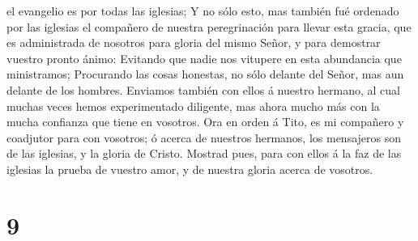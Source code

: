 el evangelio es por todas las iglesias;  Y no sólo esto,
mas también fué ordenado por las iglesias el compañero de nuestra
peregrinación para llevar esta gracia, que es administrada de nosotros
para gloria del mismo Señor, y para demostrar vuestro pronto ánimo:
 Evitando que nadie nos vitupere en esta abundancia que
ministramos;  Procurando las cosas honestas, no sólo
delante del Señor, mas aun delante de los hombres. 
Enviamos también con ellos á nuestro hermano, al cual muchas veces hemos
experimentado diligente, mas ahora mucho más con la mucha confianza que
tiene en vosotros.  Ora en orden á Tito, es mi compañero
y coadjutor para con vosotros; ó acerca de nuestros hermanos, los
mensajeros son de las iglesias, y la gloria de Cristo. 
Mostrad pues, para con ellos á la faz de las iglesias la prueba de
vuestro amor, y de nuestra gloria acerca de vosotros.

\hypertarget{section-8}{%
\section{9}\label{section-8}}

